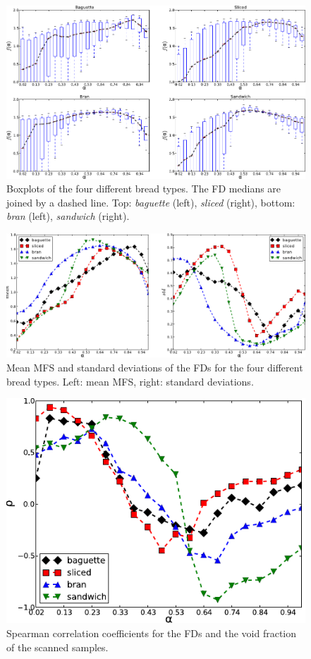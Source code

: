 \documentclass[spanish,a4paper,11pt,oneside,links]{report}
\begin{document}
\begin{figure}[h!]
\centering
\includegraphics{boxplots}
\caption{Boxplots of the four different bread types. The FD medians are joined by a dashed line. Top: {\em baguette} (left), {\em sliced} (right), bottom: {\em bran} (left), {\em sandwich} (right).}
\label{fig:boxplotsMFS}
\end{figure}

\begin{figure}[h!]
\centering
\includegraphics{panstd}
\caption{Mean MFS and standard deviations of the FDs for the four different bread types. Left: mean MFS, right: standard deviations.}
\label{fig:meansMFS}
\end{figure}


\begin{figure}[h!]
\centering
\includegraphics{VF}
\caption{Spearman correlation coefficients for the FDs and the void fraction of the scanned samples.}
\label{fig:corrVF}
\end{figure}
\end{document}
